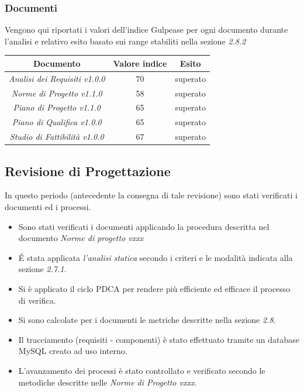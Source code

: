 {\subsubsection{Documenti}
Vengono qui riportati i valori dell’indice Gulpease per ogni documento durante l’analisi e relativo
esito basato sui range stabiliti nella sezione \emph{2.8.2}
\begin{center}
  \begin{tabular}{|c|c|c|}
    \hline
    \textbf{Documento} & \textbf{Valore indice} & \textbf{Esito} \\
    \hline
    \emph{Analisi dei Requisiti v1.0.0}  & 70 & superato \\
    \hline
    \emph{Norme di Progetto v1.1.0}   & 58  & superato \\
    \hline
    \emph{Piano di Progetto v1.1.0}   & 65 & superato \\
    \hline
    \emph{Piano di Qualifica v1.0.0}   & 65 & superato \\
    \hline
    \emph{Studio di Fattibilità v1.0.0}  & 67 & superato \\
    \hline
  \end{tabular}
  \end{center}

\subsection{Revisione di Progettazione}
In questo periodo (antecedente la consegna di tale revisione) sono stati verificati i documenti ed i processi.

\begin{itemize}
\item Sono stati verificati i documenti applicando la procedura descritta nel documento \emph{Norme di progetto vxxx}
\item \'E stata applicata \emph{l'analisi statica} secondo i criteri e le modalità indicata alla sezione \emph{2.7.1}. 
\item Si è applicato il ciclo PDCA per rendere più efficiente ed efficace il processo di verifica.
\item Si sono calcolate per i documenti le metriche descritte nella sezione \emph{2.8}.
\item Il tracciamento (requisiti - componenti) è stato effettuato tramite un database MySQL creato ad uso interno.
\item L’avanzamento dei processi è stato controllato e verificato secondo le metodiche descritte nelle \emph{Norme di Progetto vxxx}.


\end{itemize}}
